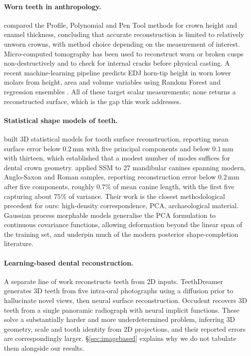 \documentclass[10pt,a4paper,twocolumn]{article}
\newcommand{\mm}{\,\mathrm{mm}}
\begin{document}
\paragraph{Worn teeth in anthropology.}
\citet{ohara2022reconstructing} compared the Profile, Polynomial and Pen Tool
methods for crown height and enamel thickness, concluding that accurate
reconstruction is limited to relatively unworn crowns, with method choice
depending on the measurement of interest. Micro-computed tomography has been used
to reconstruct worn or broken cusps non-destructively and to check for internal
cracks before physical casting. A recent machine-learning pipeline predicts EDJ
horn-tip height in worn lower molars from height, area and volume variables
using Random Forest and regression ensembles \citep{cuspml2026}. All of these
target scalar measurements; none returns a reconstructed surface, which is the
gap this work addresses.

\paragraph{Statistical shape models of teeth.}
\citet{buchaillard2007tooth} built 3D statistical models for tooth surface
reconstruction, reporting mean surface error below $0.2\mm$ with five principal
components and below $0.1\mm$ with thirteen, which established that a
modest number of modes suffices for dental crown geometry.
\citet{woods2017ssm} applied SSM to 27 mandibular canines spanning modern,
Anglo-Saxon and Roman samples, reporting reconstruction error below $0.2\mm$
after five components, roughly $0.7\%$ of mean canine length, with the first five
capturing about $75\%$ of variance. Their work is the closest methodological
precedent for ours: high-density correspondence, PCA, archaeological material.
Gaussian process morphable models \citep{luthi2018gpmm} generalise the PCA
formulation to continuous covariance functions, allowing deformation beyond the
linear span of the training set, and underpin much of the modern posterior
shape-completion literature.

\paragraph{Learning-based dental reconstruction.}
A separate line of work reconstructs teeth from 2D inputs. TeethDreamer
\citep{teethdreamer2024} generates 3D teeth from five intra-oral photographs
using a diffusion prior to hallucinate novel views, then neural surface
reconstruction. Occudent \citep{occudent2023} recovers 3D teeth from a single
panoramic radiograph with neural implicit functions. These solve a substantially
harder and more underdetermined problem, inferring 3D geometry, scale and
tooth identity from 2D projections, and their reported errors are
correspondingly larger. \S\ref{sec:imagebased} explains why we do not tabulate
them alongside our results.
\end{document}
